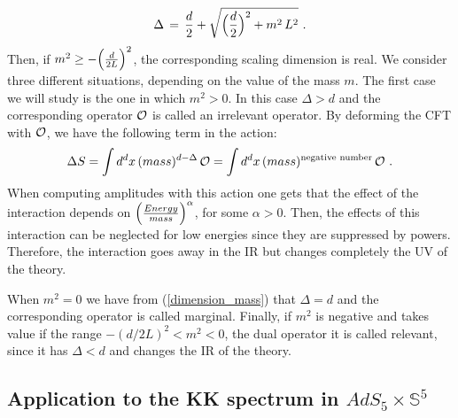 \documentclass[12pt,notitlepage,a4paper]{article}
\newcommand{\beq}{\begin{equation}}
\newcommand{\eeq}{\end{equation}}
\begin{document}
\beq
\Delta\,=\,{d\over 2}+\sqrt{\Big({d\over 2}\Big)^2+m^2\,L^2}\,\,.
\label{dimension_mass}
\eeq
Then, if $m^2\ge -\Big({d\over 2L}\Big)^2$, the corresponding scaling dimension is real.
We consider three different situations, depending on the value of the mass $m$.  The first case we will study is  the one in which $m^2>0$.  In this case $\Delta>d$ and the corresponding operator ${\cal O}$ is called an irrelevant operator. By deforming the CFT with ${\cal O}$, we have the following term in the action:
\beq
\Delta S= \int d^dx\, (mass)^{d-\Delta}\,{\cal O}=
\int d^dx\, (mass)^{{\rm negative\,\,number}}\,{\cal O}\,\,. 
\eeq
When computing amplitudes with this action one gets that the effect of the interaction depends on $\Big({Energy\over mass}\Big)^{\alpha}$, for some $\alpha>0$. Then, the effects of this interaction can be neglected for low energies since they are suppressed by powers. Therefore, the interaction goes away in the IR but changes completely the UV of the theory.



When $m^2=0$ we have from (\ref{dimension_mass}) that  $\Delta=d$ and the corresponding  operator is called marginal. Finally, if  $m^2$ is negative and takes value if the range $-(d/ 2L)^2<m^2<0$, the dual operator it is called relevant, since it has $\Delta<d$ and changes the IR of the theory. 

\subsection{Application to the KK spectrum in $AdS_5\times {\mathbb S}^5$}
\end{document}
